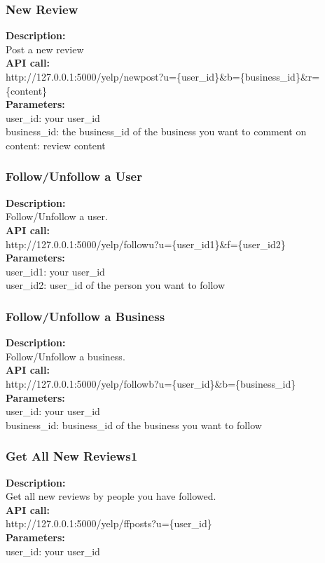 \documentclass[12pt]{article}
\begin{document}
\subsubsection{New Review}
\textbf{Description:}\\
Post a new review\\
\textbf{API call:}\\
http://127.0.0.1:5000/yelp/newpost?u=\{user\_id\}\&b=\{business\_id\}\&r=\{content\}\\
\textbf{Parameters:}\\
user\_id: your user\_id\\
business\_id: the business\_id of the business you want to comment on\\
content: review content

\subsubsection{Follow/Unfollow a User}
\textbf{Description:}\\
Follow/Unfollow a user.\\
\textbf{API call:}\\
http://127.0.0.1:5000/yelp/followu?u=\{user\_id1\}\&f=\{user\_id2\}\\
\textbf{Parameters:}\\
user\_id1: your user\_id\\
user\_id2: user\_id of the person you want to follow

\subsubsection{Follow/Unfollow a Business}
\textbf{Description:}\\
Follow/Unfollow a business.\\
\textbf{API call:}\\
http://127.0.0.1:5000/yelp/followb?u=\{user\_id\}\&b=\{business\_id\}\\
\textbf{Parameters:}\\
user\_id: your user\_id\\
business\_id: business\_id of the business you want to follow

\subsubsection{Get All New Reviews1}
\textbf{Description:}\\
Get all new reviews by people you have followed.\\
\textbf{API call:}\\ 
http://127.0.0.1:5000/yelp/ffposts?u=\{user\_id\}\\
\textbf{Parameters:}\\
user\_id: your user\_id
\end{document}
